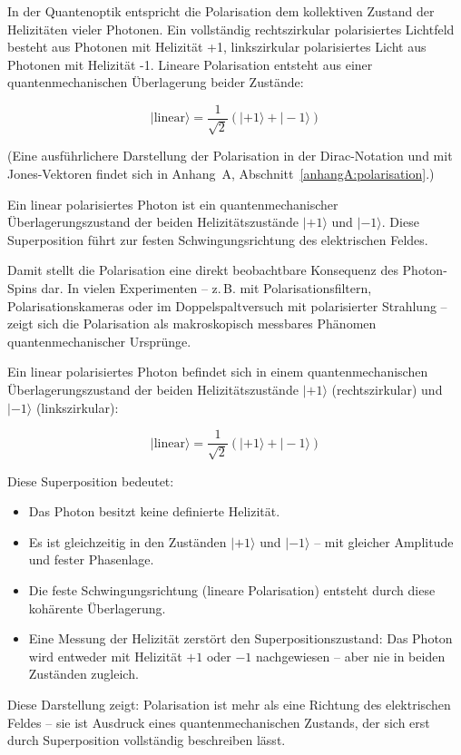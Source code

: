 \vspace{0.5em}
In der Quantenoptik entspricht die Polarisation dem kollektiven Zustand der Helizitäten vieler Photonen. Ein vollständig rechtszirkular polarisiertes Lichtfeld besteht aus Photonen mit Helizität +1, linkszirkular polarisiertes Licht aus Photonen mit Helizität -1. Lineare Polarisation entsteht aus einer quantenmechanischen Überlagerung beider Zustände:

\begin{equation}
	|\text{linear}\rangle = \frac{1}{\sqrt{2}} \left( |+1\rangle + |-1\rangle \right)
\end{equation}

(Eine ausführlichere Darstellung der Polarisation in der Dirac-Notation und mit Jones-Vektoren findet sich in Anhang~A, Abschnitt~\ref{anhangA:polarisation}.)
\medskip
\begin{tcolorbox}[physikbox, title=Superposition und Polarisation]
	\label{box:Superposition}
	Ein linear polarisiertes Photon ist ein quantenmechanischer Überlagerungszustand der beiden Helizitätszustände $|+1\rangle$ und $|-1\rangle$. Diese Superposition führt zur festen Schwingungsrichtung des elektrischen Feldes.
\end{tcolorbox}

\vspace{0.5em}
Damit stellt die Polarisation eine direkt beobachtbare Konsequenz des Photon-Spins dar. In vielen Experimenten – z.\,B. mit Polarisationsfiltern, Polarisationskameras oder im Doppelspaltversuch mit polarisierter Strahlung – zeigt sich die Polarisation als makroskopisch messbares Phänomen quantenmechanischer Ursprünge.
\medskip
\begin{tcolorbox}[physikbox, title=Superposition und Polarisation]
	\label{box:Superposition und Polarisation}
	Ein linear polarisiertes Photon befindet sich in einem quantenmechanischen Überlagerungszustand der beiden Helizitätszustände $|+1\rangle$ (rechtszirkular) und $|-1\rangle$ (linkszirkular):
	
	\[
	|\text{linear}\rangle = \frac{1}{\sqrt{2}} \left( |+1\rangle + |-1\rangle \right)
	\]
	
	Diese Superposition bedeutet:
	\begin{itemize}
		\item Das Photon besitzt keine definierte Helizität.
		\item Es ist gleichzeitig in den Zuständen $|+1\rangle$ und $|-1\rangle$ – mit gleicher Amplitude und fester Phasenlage.
		\item Die feste Schwingungsrichtung (lineare Polarisation) entsteht durch diese kohärente Überlagerung.
		\item Eine Messung der Helizität zerstört den Superpositionszustand: Das Photon wird entweder mit Helizität $+1$ oder $-1$ nachgewiesen – aber nie in beiden Zuständen zugleich.
	\end{itemize}
	
	Diese Darstellung zeigt: Polarisation ist mehr als eine Richtung des elektrischen Feldes – sie ist Ausdruck eines quantenmechanischen Zustands, der sich erst durch Superposition vollständig beschreiben lässt.
\end{tcolorbox}

